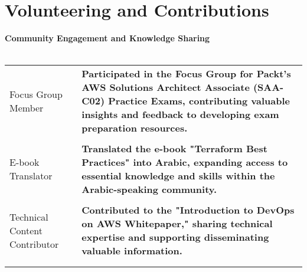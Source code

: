 \documentclass[a4paper,11pt]{article}
\begin{document}
\section{Volunteering and Contributions}


\textbf{Community Engagement and Knowledge Sharing} \\
\\
\begin{tabularx}{\linewidth}{@{}l X@{}}	
Focus Group Member & \textbf{Participated in the Focus Group for Packt's AWS Solutions Architect Associate (SAA-C02) Practice Exams, contributing valuable insights and feedback to developing exam preparation resources.}  \\
\\
E-book Translator & \textbf{Translated the e-book "Terraform Best Practices" into Arabic, expanding access to essential knowledge and skills within the Arabic-speaking community.}  \\ 
\\
Technical Content Contributor & \textbf{Contributed to the "Introduction to DevOps on AWS Whitepaper," sharing technical expertise and supporting disseminating valuable information.}  \\ 
\\
\\
\end{tabularx}
\end{document}
